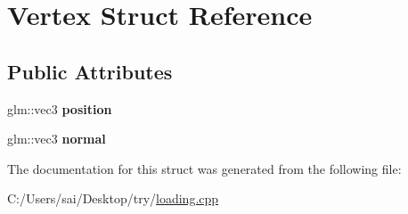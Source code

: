 \hypertarget{struct_vertex}{}\section{Vertex Struct Reference}
\label{struct_vertex}
\subsection*{Public Attributes}
\begin{DoxyCompactItemize}
\item 
\mbox{\label{struct_vertex_a030819fdc241743bbd3e180a6b132ed3}} 
glm\+::vec3 {\bfseries position}
\item 
\mbox{\label{struct_vertex_a3aa35fe84025ecf1acccb5f65f5577fd}} 
glm\+::vec3 {\bfseries normal}
\end{DoxyCompactItemize}


The documentation for this struct was generated from the following file\+:\begin{DoxyCompactItemize}
\item 
C\+:/\+Users/sai/\+Desktop/try/\mbox{\hyperlink{loading_8cpp}{loading.\+cpp}}\end{DoxyCompactItemize}
